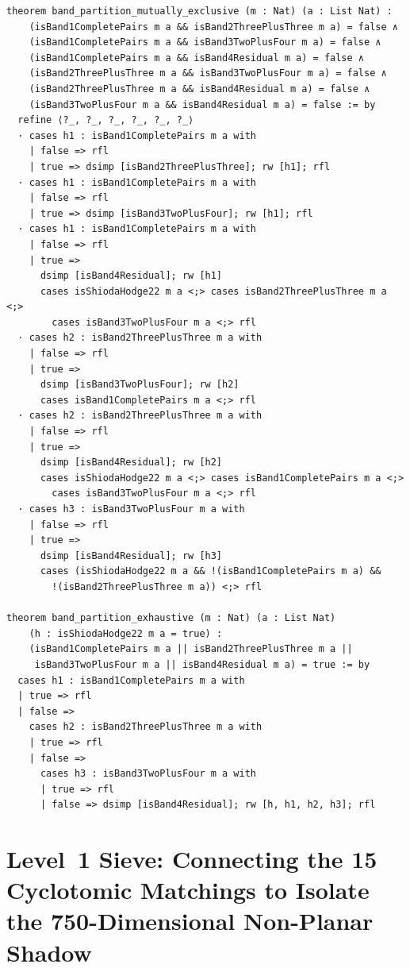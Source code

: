 \documentclass[11pt,a4paper]{article}
\begin{document}
\begin{lstlisting}[caption={Universal band-partition exclusivity and exhaustiveness in \texttt{MathlibPR\_ShiodaAokiFermat.lean}.}]
theorem band_partition_mutually_exclusive (m : Nat) (a : List Nat) :
    (isBand1CompletePairs m a && isBand2ThreePlusThree m a) = false ∧
    (isBand1CompletePairs m a && isBand3TwoPlusFour m a) = false ∧
    (isBand1CompletePairs m a && isBand4Residual m a) = false ∧
    (isBand2ThreePlusThree m a && isBand3TwoPlusFour m a) = false ∧
    (isBand2ThreePlusThree m a && isBand4Residual m a) = false ∧
    (isBand3TwoPlusFour m a && isBand4Residual m a) = false := by
  refine ⟨?_, ?_, ?_, ?_, ?_, ?_⟩
  · cases h1 : isBand1CompletePairs m a with
    | false => rfl
    | true => dsimp [isBand2ThreePlusThree]; rw [h1]; rfl
  · cases h1 : isBand1CompletePairs m a with
    | false => rfl
    | true => dsimp [isBand3TwoPlusFour]; rw [h1]; rfl
  · cases h1 : isBand1CompletePairs m a with
    | false => rfl
    | true =>
      dsimp [isBand4Residual]; rw [h1]
      cases isShiodaHodge22 m a <;> cases isBand2ThreePlusThree m a <;>
        cases isBand3TwoPlusFour m a <;> rfl
  · cases h2 : isBand2ThreePlusThree m a with
    | false => rfl
    | true =>
      dsimp [isBand3TwoPlusFour]; rw [h2]
      cases isBand1CompletePairs m a <;> rfl
  · cases h2 : isBand2ThreePlusThree m a with
    | false => rfl
    | true =>
      dsimp [isBand4Residual]; rw [h2]
      cases isShiodaHodge22 m a <;> cases isBand1CompletePairs m a <;>
        cases isBand3TwoPlusFour m a <;> rfl
  · cases h3 : isBand3TwoPlusFour m a with
    | false => rfl
    | true =>
      dsimp [isBand4Residual]; rw [h3]
      cases (isShiodaHodge22 m a && !(isBand1CompletePairs m a) &&
        !(isBand2ThreePlusThree m a)) <;> rfl

theorem band_partition_exhaustive (m : Nat) (a : List Nat)
    (h : isShiodaHodge22 m a = true) :
    (isBand1CompletePairs m a || isBand2ThreePlusThree m a ||
     isBand3TwoPlusFour m a || isBand4Residual m a) = true := by
  cases h1 : isBand1CompletePairs m a with
  | true => rfl
  | false =>
    cases h2 : isBand2ThreePlusThree m a with
    | true => rfl
    | false =>
      cases h3 : isBand3TwoPlusFour m a with
      | true => rfl
      | false => dsimp [isBand4Residual]; rw [h, h1, h2, h3]; rfl
\end{lstlisting}

\section{Level~1 Sieve: Connecting the 15 Cyclotomic Matchings to Isolate the 750-Dimensional Non-Planar Shadow}
\end{document}
